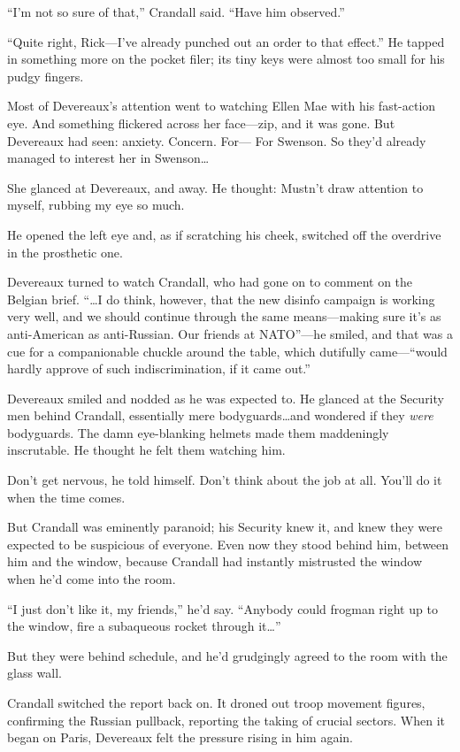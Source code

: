 ``I'm not so sure of that,'' Crandall said. ``Have him observed.''

``Quite right, Rick---I've already punched out an order to that effect.'' He tapped in something more on the pocket filer; its tiny keys were almost too small for his pudgy fingers.

Most of Devereaux's attention went to watching Ellen Mae with his fast-action eye. And something flickered across her face---zip, and it was gone. But Devereaux had seen: anxiety. Concern. For--- For Swenson. So they'd already managed to interest her in Swenson\ldots

She glanced at Devereaux, and away. He thought: Mustn't draw attention to myself, rubbing my eye so much.

He opened the left eye and, as if scratching his cheek, switched off the overdrive in the prosthetic one.

Devereaux turned to watch Crandall, who had gone on to comment on the Belgian brief. ``\ldots I do think, however, that the new disinfo campaign is working very well, and we should continue through the same means---making sure it's as anti-American as anti-Russian. Our friends at NATO''---he smiled, and that was a cue for a companionable chuckle around the table, which dutifully came---``would hardly approve of such indiscrimination, if it came out.''

Devereaux smiled and nodded as he was expected to. He glanced at the Security men behind Crandall, essentially mere bodyguards\ldots and wondered if they \textit{were} bodyguards. The damn eye-blanking helmets made them maddeningly inscrutable. He thought he felt them watching him.

Don't get nervous, he told himself. Don't think about the job at all. You'll do it when the time comes.

But Crandall was eminently paranoid; his Security knew it, and knew they were expected to be suspicious of everyone. Even now they stood behind him, between him and the window, because Crandall had instantly mistrusted the window when he'd come into the room.

``I just don't like it, my friends,'' he'd say. ``Anybody could frogman right up to the window, fire a subaqueous rocket through it\ldots ''

But they were behind schedule, and he'd grudgingly agreed to the room with the glass wall.

Crandall switched the report back on. It droned out troop movement figures, confirming the Russian pullback, reporting the taking of crucial sectors. When it began on Paris, Devereaux felt the pressure rising in him again.

